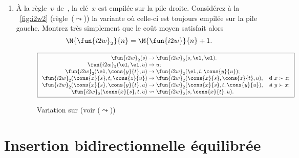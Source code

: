 \begin{enumerate}
  \item À la règle~\(\upsilon\) de~,
    la clé~\(x\) est empilée sur la pile droite. Considérez à la
    \fig~\vref{fig:i2w2} (règle~(\(\leadsto\))) la variante où
    celle-ci est toujours empilée sur la pile gauche. Montrez très
    simplement que le coût moyen satisfait alors
    \begin{equation*}
      \M{\fun{i2w}_2}{n} = \M{\fun{i2w}}{n} + 1.
    \end{equation*}
    \begin{figure}[h]
    \begin{equation*}
      \boxed{%
      \begin{array}{r@{\;}l@{\;}ll}
        \fun{i2w}_2(s)         & \rightarrow
                               & \fun{i2w}_2(s,\el,\el).\\
        \fun{i2w}_2(\el,\el,u) & \rightarrow
                               & u;\\
        \fun{i2w}_2(\el,\cons{y}{t},u)
                               & \rightarrow
                               & \fun{i2w}_2(\el,t,\cons{y}{u});\\
        \fun{i2w}_2(\cons{x}{s},t,\cons{z}{u})
                               & \rightarrow
                               & \fun{i2w}_2(\cons{x}{s},\cons{z}{t},u),
                               & \text{si \(x \succ z\)};\\
        \fun{i2w}_2(\cons{x}{s},\cons{y}{t},u)
                               & \rightarrow
                               & \fun{i2w}_2(\cons{x}{s},t,\cons{y}{u}),
                               & \text{si \(y \succ x\)};\\
        \fun{i2w}_2(\cons{x}{s},t,u)
                               & \leadsto
                               & \fun{i2w}_2(s,\cons{x}{t},u).
      \end{array}}
    \end{equation*}
    \caption{Variation  sur  (voir
      (\(\leadsto\)))\label{fig:i2w2}}
    \end{figure}

\end{enumerate}

\section{Insertion bidirectionnelle équilibrée}

